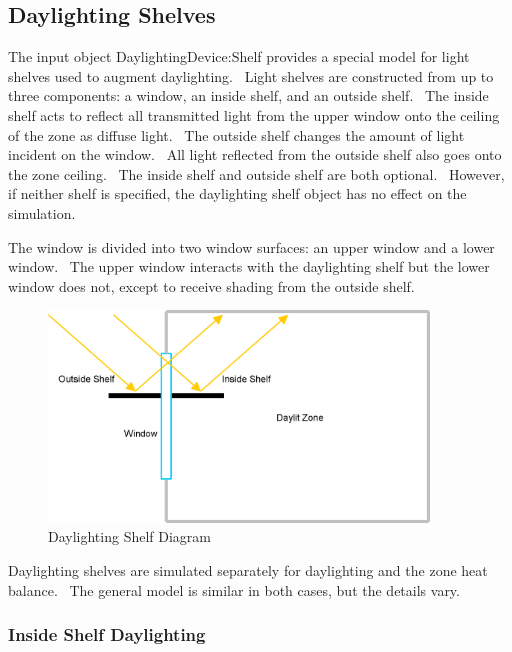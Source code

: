 \subsection{Daylighting Shelves}\label{daylighting-shelves}

The input object DaylightingDevice:Shelf provides a special model for light shelves used to augment daylighting.~ Light shelves are constructed from up to three components: a window, an inside shelf, and an outside shelf.~ The inside shelf acts to reflect all transmitted light from the upper window onto the ceiling of the zone as diffuse light.~ The outside shelf changes the amount of light incident on the window.~ All light reflected from the outside shelf also goes onto the zone ceiling.~ The inside shelf and outside shelf are both optional.~ However, if neither shelf is specified, the daylighting shelf object has no effect on the simulation.

The window is divided into two window surfaces: an upper window and a lower window.~ The upper window interacts with the daylighting shelf but the lower window does not, except to receive shading from the outside shelf.

\begin{figure}[hbtp] %
\centering
\includegraphics[width=0.9\textwidth, height=0.9\textheight, keepaspectratio=true]{media/image893.png}
\caption{Daylighting Shelf Diagram \protect \label{fig:daylighting-shelf-diagram}}
\end{figure}

Daylighting shelves are simulated separately for daylighting and the zone heat balance.~ The general model is similar in both cases, but the details vary.

\subsubsection{Inside Shelf Daylighting}\label{inside-shelf-daylighting}

